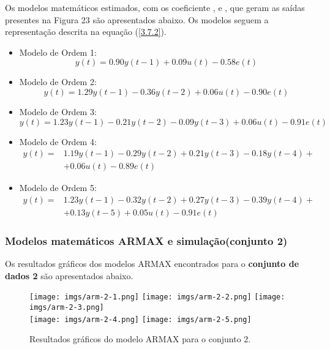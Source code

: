 \documentclass[a4paper,12pt]{article}
\begin{document}
Os modelos matemáticos estimados, com os coeficiente ,  e , que geram as saídas presentes na Figura 23 são apresentados abaixo. Os modelos seguem a representação descrita na equação (\ref{3.7.2}).
\begin{itemize}
    \item Modelo de Ordem 1:
    \begin{equation*}
    y(t) = 0.90y(t-1) + 0.09u(t) - 0.58e(t)
    \end{equation*}
    
    \item Modelo de Ordem 2:
    \begin{equation*}
    y(t) = 1.29y(t-1) - 0.36y(t-2) + 0.06u(t) - 0.90e(t)
    \end{equation*}
    
    \item Modelo de Ordem 3:
    \begin{equation*}
    y(t) = 1.23y(t-1) - 0.21y(t-2) - 0.09y(t-3) + 0.06u(t) - 0.91e(t)
    \end{equation*}
    
    \item Modelo de Ordem 4:
    \begin{align}
    y(t) = &1.19y(t-1) - 0.29y(t-2) + 0.21y(t-3) - 0.18y(t-4) + \nonumber\\
    & + 0.06u(t) - 0.89e(t) \nonumber
    \end{align}
    
    \item Modelo de Ordem 5:
    \begin{align}
    y(t) = &1.23y(t-1) - 0.32y(t-2) + 0.27y(t-3) - 0.39y(t-4) +\nonumber \\
    & + 0.13y(t-5) + 0.05u(t) - 0.91e(t) \nonumber
    \end{align}
\end{itemize}

\subsubsection{Modelos matemáticos ARMAX e simulação(conjunto 2)}

Os resultados gráficos dos modelos ARMAX encontrados para o \textbf{conjunto de dados 2} são apresentados abaixo.

\begin{figure}[h!]
\centering

\texttt{[image: imgs/arm-2-1.png]} \quad
\texttt{[image: imgs/arm-2-2.png]} \quad
\texttt{[image: imgs/arm-2-3.png]} \\

\texttt{[image: imgs/arm-2-4.png]} \quad
\texttt{[image: imgs/arm-2-5.png]}

\caption{Resultados gráficos do modelo ARMAX para o conjunto 2.}
\end{figure}
\end{document}
